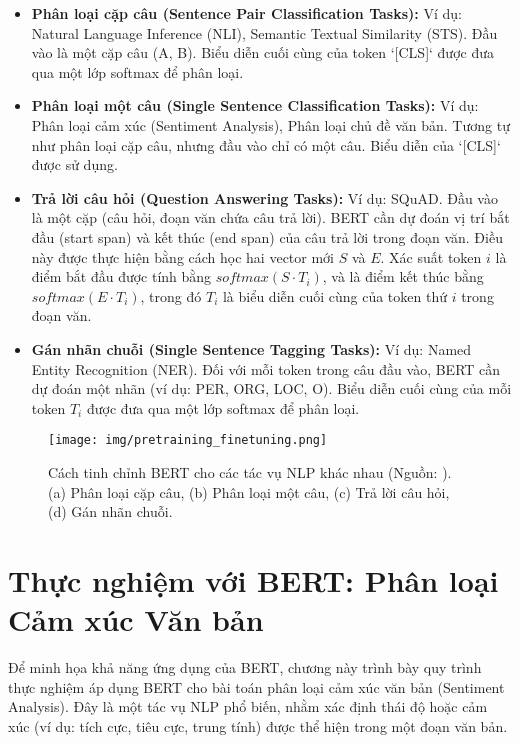 \begin{itemize}
    \item \textbf{Phân loại cặp câu (Sentence Pair Classification Tasks):} Ví dụ: Natural Language Inference (NLI), Semantic Textual Similarity (STS).
    Đầu vào là một cặp câu (A, B). Biểu diễn cuối cùng của token `[CLS]` được đưa qua một lớp softmax để phân loại.
    \item \textbf{Phân loại một câu (Single Sentence Classification Tasks):} Ví dụ: Phân loại cảm xúc (Sentiment Analysis), Phân loại chủ đề văn bản.
    Tương tự như phân loại cặp câu, nhưng đầu vào chỉ có một câu. Biểu diễn của `[CLS]` được sử dụng.
    \item \textbf{Trả lời câu hỏi (Question Answering Tasks):} Ví dụ: SQuAD.
    Đầu vào là một cặp (câu hỏi, đoạn văn chứa câu trả lời). BERT cần dự đoán vị trí bắt đầu (start span) và kết thúc (end span) của câu trả lời trong đoạn văn. Điều này được thực hiện bằng cách học hai vector mới $S$ và $E$. Xác suất token $i$ là điểm bắt đầu được tính bằng $softmax(S \cdot T_i)$, và là điểm kết thúc bằng $softmax(E \cdot T_i)$, trong đó $T_i$ là biểu diễn cuối cùng của token thứ $i$ trong đoạn văn.
    \item \textbf{Gán nhãn chuỗi (Single Sentence Tagging Tasks):} Ví dụ: Named Entity Recognition (NER).
    Đối với mỗi token trong câu đầu vào, BERT cần dự đoán một nhãn (ví dụ: PER, ORG, LOC, O). Biểu diễn cuối cùng của mỗi token $T_i$ được đưa qua một lớp softmax để phân loại.
\end{itemize}

\begin{figure}[H]
    \centering
    \texttt{[image: img/pretraining\_finetuning.png]}
    \caption{Cách tinh chỉnh BERT cho các tác vụ NLP khác nhau (Nguồn: \cite{devlin2018bert}). (a) Phân loại cặp câu, (b) Phân loại một câu, (c) Trả lời câu hỏi, (d) Gán nhãn chuỗi.}
    \label{fig:bert_finetuning_tasks}
\end{figure}

\section{Thực nghiệm với BERT: Phân loại Cảm xúc Văn bản}
\label{sec:thuc_nghiem_bert}
Để minh họa khả năng ứng dụng của BERT, chương này trình bày quy trình thực nghiệm áp dụng BERT cho bài toán phân loại cảm xúc văn bản (Sentiment Analysis). Đây là một tác vụ NLP phổ biến, nhằm xác định thái độ hoặc cảm xúc (ví dụ: tích cực, tiêu cực, trung tính) được thể hiện trong một đoạn văn bản.

